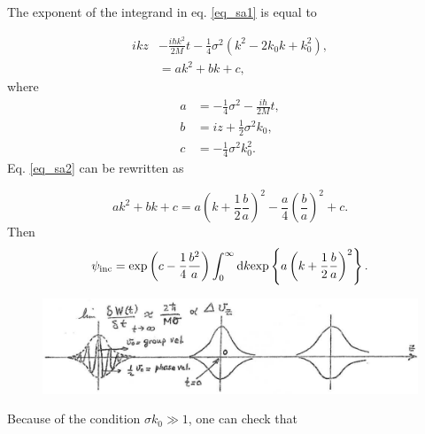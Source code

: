 The exponent of the integrand in eq. \ref{eq_sa1} is equal to

\begin{equation}\label{eq_sa2}
\begin{split}
ikz &- \frac{i\hbar k^2}{2M} t - \frac{1}{4} \sigma^2 (k^2 -2k_0k +k_0^2), \\
&= a k^2 + b k + c,
\end{split}
\end{equation}
where
\begin{equation}\label{eq_sa6}
\begin{split}
a &= -\frac{1}{4} \sigma^2 - \frac{i \hbar}{2M} t, \\
b &= iz + \frac{1}{2} \sigma^2 k_0, \\
c &= - \frac{1}{4} \sigma^2 k_0^2.
\end{split}
\end{equation}
Eq. \ref{eq_sa2} can be rewritten as

\begin{equation}
\nonumber
a k^2 + bk + c = a \left( k + \frac{1}{2}\frac{b}{a} \right)^2 - \frac{a}{4} \left( \frac{b}{a} \right)^2 + c.
\end{equation}
Then
\begin{equation}
\psi_{\rm inc} = {\rm exp} \left( c - \frac{1}{4} \frac{b^2}{a} \right) \int_0^{\infty} {\rm d}k {\rm exp} \left\{ a \left( k + \frac{1}{2} \frac{b}{a} \right)^2 \right\}.
\end{equation}

\begin{figure}
\centerline{\includegraphics*[width=12cm,angle=0]{C3/figs_C3/2_1.pdf}}
\caption{}\label{fig2nd_1}
\end{figure}
 Because of the condition $\sigma k_0 \gg 1$, one can check that

